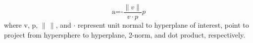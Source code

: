 \begin{equation} \label{eq:linear-proj}
	\text{a=-}\frac{\| v\| }{v\cdot p}p
\end{equation}
where $\text{v}$, $\text{p}$, $\| \, \|$, and $\cdot$ represent unit normal to hyperplane of interest, point to project from hypersphere to hyperplane, 2-norm, and dot product, respectively.